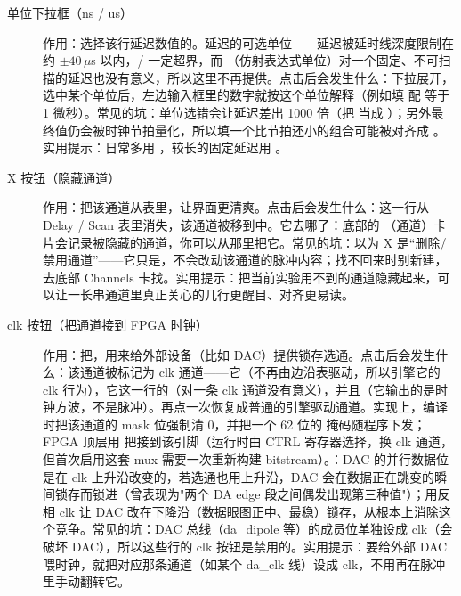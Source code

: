 \documentclass[11pt,oneside,openany]{book}
\begin{document}
\begin{description}
\item[单位下拉框（ns / us）] 作用：选择该行延迟数值的。延迟的可选单位——延迟被延时线深度限制在约 $\pm40\,\mu$s 以内，/ 一定超界，而 （仿射表达式单位）对一个固定、不可扫描的延迟也没有意义，所以这里不再提供。点击后会发生什么：下拉展开，选中某个单位后，左边输入框里的数字就按这个单位解释（例如填  配  等于 1 微秒）。常见的坑：单位选错会让延迟差出 1000 倍（把  当成 ）；另外最终值仍会被时钟节拍量化，所以填一个比节拍还小的组合可能被对齐成 。实用提示：日常多用 ，较长的固定延迟用 。

\item[X 按钮（隐藏通道）] 作用：把该通道从表里，让界面更清爽。点击后会发生什么：这一行从 Delay / Scan 表里消失，该通道被移到中。它去哪了：底部的 （通道）卡片会记录被隐藏的通道，你可以从那里把它。常见的坑：以为 X 是“删除/禁用通道”——它只是，不会改动该通道的脉冲内容；找不回来时别新建，去底部 Channels 卡找。实用提示：把当前实验用不到的通道隐藏起来，可以让一长串通道里真正关心的几行更醒目、对齐更易读。

\item[clk 按钮（把通道接到 FPGA 时钟）] 作用：把，用来给外部设备（比如 DAC）提供锁存选通。点击后会发生什么：该通道被标记为 clk 通道——它（不再由边沿表驱动，所以引擎它的 clk 行为），它这一行的（对一条 clk 通道没有意义），并且（它输出的是时钟方波，不是脉冲）。再点一次恢复成普通的引擎驱动通道。实现上，编译时把该通道的 mask 位强制清 0，并把一个 62 位的  掩码随程序下发；FPGA 顶层用  把接到该引脚（运行时由 CTRL 寄存器选择，换 clk 通道，但首次启用这套 mux 需要一次重新构建 bitstream）。：DAC 的并行数据位是在 clk 上升沿改变的，若选通也用上升沿，DAC 会在数据正在跳变的瞬间锁存而锁进（曾表现为"两个 DA edge 段之间偶发出现第三种值"）；用反相 clk 让 DAC 改在下降沿（数据眼图正中、最稳）锁存，从根本上消除这个竞争。常见的坑：DAC 总线（da\_dipole 等）的成员位单独设成 clk（会破坏 DAC），所以这些行的 clk 按钮是禁用的。实用提示：要给外部 DAC 喂时钟，就把对应那条通道（如某个 da\_clk 线）设成 clk，不用再在脉冲里手动翻转它。
\end{description}
\end{document}
